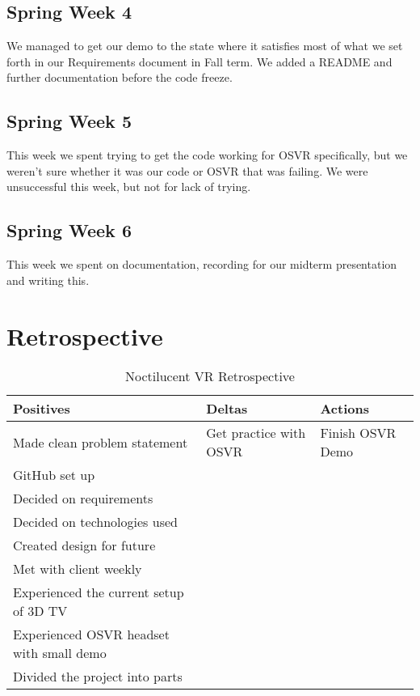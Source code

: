 \documentclass[draftclsnofoot,onecolumn]{IEEEtran}
\begin{document}
\subsection{Spring Week 4}

We managed to get our demo to the state where it satisfies most of what we set forth in our Requirements document in Fall term. 
We added a README and further documentation before the code freeze.

\subsection{Spring Week 5}

This week we spent trying to get the code working for OSVR specifically, but we weren’t sure whether it was our code or OSVR that was failing. 
We were unsuccessful this week, but not for lack of trying.

\subsection{Spring Week 6}

This week we spent on documentation, recording for our midterm presentation and writing this.

\section{Retrospective}

\begin{table}[ht]
\caption{Noctilucent VR Retrospective}
\centering
\begin{tabular}{l l l}
\hline\hline
Positives & Deltas & Actions \\ [0.5ex]
\hline
Made clean problem statement & Get practice with OSVR & Finish OSVR Demo \\
GitHub set up & & \\
Decided on requirements & & \\
Decided on technologies used & & \\
Created design for future &  & \\
Met with client weekly & & \\
Experienced the current setup of 3D TV & & \\
Experienced OSVR headset with small demo & & \\
Divided the project into parts & & \\ [1ex]
\hline
\end{tabular}
\end{table}
\end{document}
